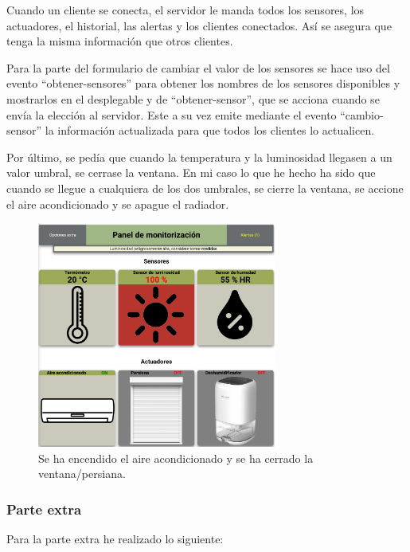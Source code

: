 \documentclass{article}
\begin{document}
\bigskip

Cuando un cliente se conecta, el servidor le manda todos los sensores, los actuadores, el historial, las alertas y los clientes conectados. Así se asegura que tenga la misma información que otros clientes.

\bigskip

Para la parte del formulario de cambiar el valor de los sensores se hace uso del evento ``obtener-sensores'' para obtener los nombres de los sensores disponibles y mostrarlos en el desplegable y de ``obtener-sensor'', que se acciona cuando se envía la elección al servidor. Este a su vez emite mediante el evento ``cambio-sensor'' la información actualizada para que todos los clientes lo actualicen.

\bigskip

Por último, se pedía que cuando la temperatura y la luminosidad llegasen a un valor umbral, se cerrase la ventana. En mi caso lo que he hecho ha sido que cuando se llegue a cualquiera de los dos umbrales, se cierre la ventana, se accione el aire acondicionado y se apague el radiador.

\begin{figure}[H]
    \centering
    \includegraphics[width=0.7\textwidth]{images/muchaluz.png}
    \caption{Se ha encendido el aire acondicionado y se ha cerrado la ventana/persiana.}
\end{figure}

\newpage

\subsubsection{Parte extra}
Para la parte extra he realizado lo siguiente:
\end{document}
